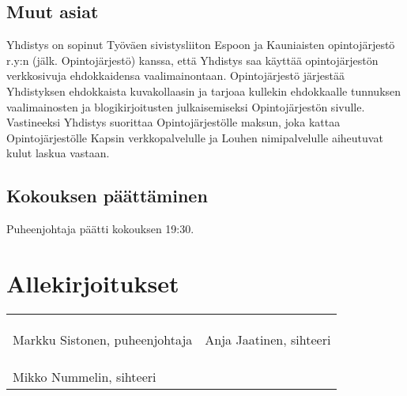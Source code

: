 \documentclass[a4paper,12pt]{article}
\begin{document}
\subsection{Muut asiat}
Yhdistys on sopinut Työväen sivistysliiton Espoon ja Kauniaisten opintojärjestö r.y:n (jälk. Opintojärjestö) kanssa, että Yhdistys saa käyttää opintojärjestön verkkosivuja ehdokkaidensa vaalimainontaan. Opintojärjestö järjestää Yhdistyksen ehdokkaista kuvakollaasin ja tarjoaa kullekin ehdokkaalle tunnuksen vaalimainosten ja blogikirjoitusten julkaisemiseksi Opintojärjestön sivulle. Vastineeksi Yhdistys suorittaa Opintojärjestölle maksun, joka kattaa Opintojärjestölle Kapsin verkkopalvelulle ja Louhen nimipalvelulle aiheutuvat kulut laskua vastaan.
\subsection{Kokouksen päättäminen}
Puheenjohtaja päätti kokouksen 19:30.
\section*{Allekirjoitukset}
\begin{flushleft}
\begin{tabular}{ll}
& \\
& \\
& \\
Markku Sistonen, puheenjohtaja &
Anja Jaatinen, sihteeri \\
& \\
& \\
& \\
Mikko Nummelin, sihteeri
\end{tabular}
\end{flushleft}
\end{document}
